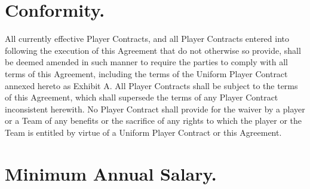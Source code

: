 \documentclass[
]{book}
\begin{document}
\hypertarget{conformity.}{%
\section{Conformity.}\label{conformity.}}

All currently effective Player Contracts, and all Player Contracts entered into following the execution of this Agreement that do not otherwise so provide, shall be deemed amended in such manner to require the parties to comply with all terms of this Agreement, including the terms of the Uniform Player Contract annexed hereto as Exhibit A. All Player Contracts shall be subject to the terms of this Agreement, which shall supersede the terms of any Player Contract inconsistent herewith. No Player Contract shall provide for the waiver by a player or a Team of any benefits or the sacrifice of any rights to which the player or the Team is entitled by virtue of a Uniform Player Contract or this Agreement.

\hypertarget{minimum-annual-salary.}{%
\section{Minimum Annual Salary.}\label{minimum-annual-salary.}}
\end{document}
